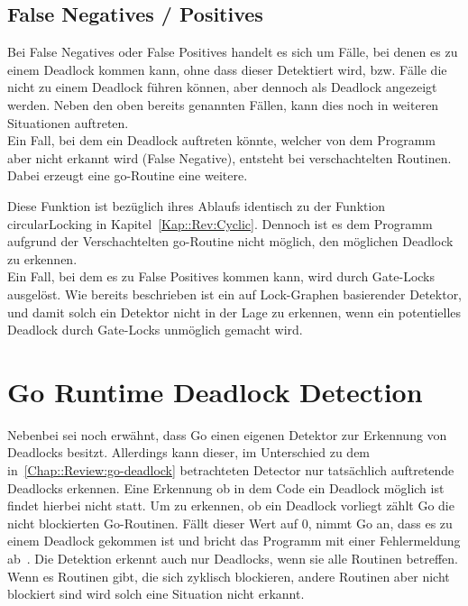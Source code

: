 \subsection{False Negatives / Positives} \label{Kap::Rev:False}
Bei False Negatives oder False Positives handelt es sich um Fälle, bei denen es 
zu einem Deadlock kommen kann, ohne dass dieser Detektiert wird, bzw. Fälle die
nicht zu einem 
Deadlock führen können, aber dennoch als Deadlock angezeigt werden. 
Neben den oben bereits genannten Fällen, kann dies noch in weiteren Situationen
auftreten.\\
Ein Fall,
bei dem ein Deadlock auftreten könnte, welcher von dem Programm aber nicht erkannt
wird (False Negative), entsteht bei verschachtelten Routinen. Dabei erzeugt eine go-Routine eine 
weitere.
\begin{figure}[H]
    
\end{figure}
Diese Funktion ist bezüglich ihres Ablaufs identisch zu der Funktion 
circularLocking in Kapitel~\ref*{Kap::Rev:Cyclic}. Dennoch ist es dem 
Programm aufgrund der Verschachtelten go-Routine nicht möglich, den möglichen 
Deadlock zu erkennen. \\
Ein Fall, bei dem es zu False Positives kommen kann, wird durch Gate-Locks
ausgelöst. Wie bereits beschrieben ist ein auf Lock-Graphen basierender Detektor,
und damit solch ein Detektor nicht in der Lage zu erkennen, wenn ein 
potentielles Deadlock durch Gate-Locks unmöglich gemacht wird.

\section{Go Runtime Deadlock Detection}\label{Kap::Review:GRDD}
Nebenbei sei noch erwähnt, dass Go einen eigenen Detektor zur Erkennung von Deadlocks
besitzt. Allerdings kann 
dieser, im Unterschied zu dem in~\ref{Chap::Review:go-deadlock} betrachteten 
Detector nur tatsächlich auftretende Deadlocks erkennen. Eine Erkennung ob 
in dem Code ein Deadlock möglich ist findet hierbei nicht statt. Um zu erkennen,
ob ein Deadlock vorliegt zählt Go die nicht blockierten Go-Routinen.
Fällt dieser Wert auf $0$, nimmt Go an, dass es zu einem Deadlock gekommen 
ist und bricht das Programm mit einer Fehlermeldung ab~\cite{grdd_code}. Die 
Detektion erkennt auch nur Deadlocks, wenn sie alle Routinen betreffen. 
Wenn es Routinen gibt, die sich zyklisch blockieren, andere Routinen aber 
nicht blockiert sind wird solch eine Situation nicht erkannt.
